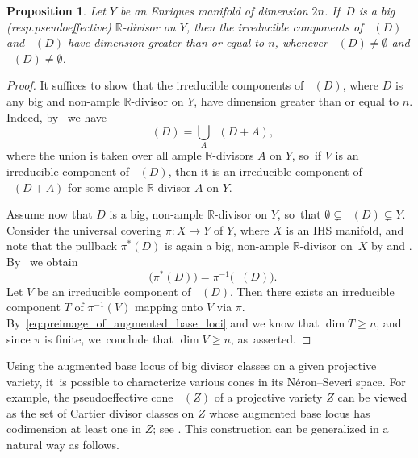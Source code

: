 \documentclass[10pt]{amsart}
\newcommand{\resp}{resp.}
\theoremstyle{plain}
\newtheorem{prop}[thm]{Proposition}
\theoremstyle{definition}
\newcommand{\R}{\mathbb{R}}
\DeclareMathOperator{\Pseff}{\overline{\mathrm{Eff}}}
\DeclareMathOperator{\dbs}{\boldsymbol{B}_{--}}
\DeclareMathOperator{\abs}{\boldsymbol{B}_{+}}
\begin{document}
\begin{prop}
\label{prop:abl_Enriques}
Let $Y$ be an Enriques manifold of dimension $2n$. If~$D$ is a big (\resp pseudoeffective) $\R$\nobreakdash-divisor on $Y$, then the irreducible components of $\abs(D)$ and $\dbs(D)$ have dimension greater than or equal to $n$, whenever $\abs(D) \neq \emptyset$ and $\dbs(D) \neq \emptyset$.
\end{prop}

\begin{proof}
It suffices to show that the irreducible components of $\abs(D)$, where $D$ is any big and non-ample $\R$\nobreakdash-divisor on $Y$, have dimension greater than or equal to $n$. Indeed, by~\cite[Lem.\,1.14]{ELMNP06} we have
\[
\dbs(D)= \bigcup_{A} \abs(D+A),
\]
where the union is taken over all ample $\R$\nobreakdash-divisors $A$ on $Y$, so~if $V$ is an irreducible component of $\dbs(D)$, then it is an irreducible component of $\abs(D+A)$ for some ample $\R$\nobreakdash-divisor $A$ on $Y$.

Assume now that $D$ is a big, non-ample $\R$\nobreakdash-divisor on $Y$, so~that $\emptyset \subsetneq \abs(D) \subsetneq Y$. Consider the universal covering $\pi \colon X \to Y$ of $Y$, where $X$ is an IHS manifold, and note that the pullback $\pi^*(D)$ is again a big, non-ample $\R$\nobreakdash-divisor on~$X$ by \cite[Cor.\,1.2.28]{Laz04book_I} and \cite[Prop.\,2.9(1)]{Kuronya06}. By~\cite[Th.\,1.1(1.1.2)]{Gomez25} we obtain
\begin{equation}
\label{eq:preimage_of_augmented_base_loci}
\abs \bigl(\pi^*(D) \bigr) = \pi^{-1} \bigl(\abs(D) \bigr).
\end{equation}
Let $V$ be an irreducible component of $\abs(D)$. Then there exists an irreducible component $T$ of $\pi^{-1}(V)$ mapping onto $V$ via $\pi$. By~\eqref{eq:preimage_of_augmented_base_loci} and \cite[Th.\,A(1)]{DRO25} we know that $\dim T \geq n$, and since $\pi$ is finite, we~conclude that $\dim V \geq n$, as~asserted.
\end{proof}

Using the augmented base locus of big divisor classes on a given projective variety, it~is possible to characterize various cones in its Néron--Severi space. For example, the pseudoeffective cone $\Pseff(Z)$ of a projective variety $Z$ can be viewed as the set of Cartier divisor classes on $Z$ whose augmented base locus has codimension at least one in $Z$; see \cite[Ex.\,1.7 \& Ex.\,1.18]{ELMNP06}. This construction can be generalized in a natural way as follows.
\end{document}
